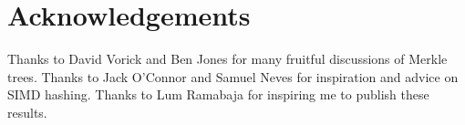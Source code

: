 \documentclass[twocolumn]{article}
\begin{document}
\section{Acknowledgements}

Thanks to David Vorick and Ben Jones for many fruitful discussions of Merkle trees. Thanks to Jack O'Connor and Samuel Neves for inspiration and advice on SIMD hashing. Thanks to Lum Ramabaja for inspiring me to publish these results.




\end{document}
